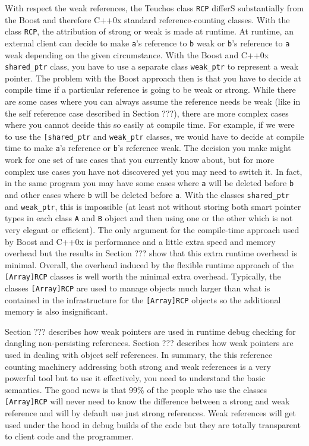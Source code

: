 \documentclass[pdf,ps2pdf,11pt]{SANDreport}
\begin{document}
With respect the weak references, the Teuchos class {}\texttt{RCP}
differS substantially from the Boost and therefore C++0x standard
reference-counting classes.  With the class {}\texttt{RCP}, the
attribution of strong or weak is made at runtime.  At runtime, an
external client can decide to make {}\texttt{a}'s reference to
{}\texttt{b} weak or {}\texttt{b}'s reference to {}\texttt{a} weak
depending on the given circumstance.  With the Boost and C++0x
{}\texttt{shared\_ptr} class, you have to use a separate class
{}\texttt{weak\_ptr} to represent a weak pointer.  The problem with
the Boost approach then is that you have to decide at compile time if
a particular reference is going to be weak or strong.  While there are
some cases where you can always assume the reference needs be weak
(like in the self reference case described in Section ???), there are
more complex cases where you cannot decide this so easily at compile
time.  For example, if we were to use the {}\texttt{[shared\_ptr} and
{}\texttt{weak\_ptr} classes, we would have to decide at compile time
to make {}\texttt{a}'s reference or {}\texttt{b}'s reference weak.
The decision you make might work for one set of use cases that you
currently know about, but for more complex use cases you have not
discovered yet you may need to switch it.  In fact, in the same
program you may have some cases where {}\texttt{a} will be deleted
before {}\texttt{b} and other cases where {}\texttt{b} will be deleted
before {}\texttt{a}.  With the classes {}\texttt{shared\_ptr} and
{}\texttt{weak\_ptr}, this is impossible (at least not without storing
both smart pointer types in each class {}\texttt{A} and {}\texttt{B}
object and then using one or the other which is not very elegant or
efficient).  The only argument for the compile-time approach used by
Boost and C++0x is performance and a little extra speed and memory
overhead but the results in Section ??? show that this extra runtime
overhead is minimal.  Overall, the overhead induced by the flexible
runtime approach of the {}\texttt{[Array]RCP} classes is well worth
the minimal extra overhead.  Typically, the classes
{}\texttt{[Array]RCP} are used to manage objects much larger than what
is contained in the infrastructure for the {}\texttt{[Array]RCP}
objects so the additional memory is also insignificant.

Section ??? describes how weak pointers are used in runtime debug
checking for dangling non-persisting references.  Section ??? 
describes how weak pointers are used in dealing with object self
references.  In summary, the this reference counting machinery
addressing both strong and weak references is a very powerful tool but
to use it effectively, you need to understand the basic semantics.
The good news is that 99\% of the people who use the classes
{}\texttt{[Array]RCP} will never need to know the difference between a
strong and weak reference and will by default use just strong
references.  Weak references will get used under the hood in debug
builds of the code but they are totally transparent to client code and
the programmer.
\end{document}
